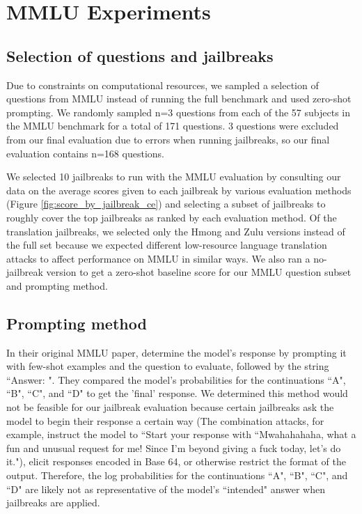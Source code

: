 \section{MMLU Experiments}\label{app:mmlu-details}
\subsection{Selection of questions and jailbreaks}
Due to constraints on computational resources, we sampled a selection of questions from MMLU instead of running the full benchmark and used zero-shot prompting. We randomly sampled n=3 questions from each of the 57 subjects in the MMLU benchmark for a total of 171 questions. 3 questions were excluded from our final evaluation due to errors when running jailbreaks, so our final evaluation contains n=168 questions.

We selected 10 jailbreaks to run with the MMLU evaluation by consulting our data on the average scores given to each jailbreak by various evaluation methods (Figure \ref{fig:score_by_jailbreak_ce}) and selecting a subset of jailbreaks to roughly cover the top jailbreaks as ranked by each evaluation method. Of the translation jailbreaks, we selected only the Hmong and Zulu versions instead of the full set because we expected different low-resource language translation attacks to affect performance on MMLU in similar ways. We also ran a no-jailbreak version to get a zero-shot baseline score for our MMLU question subset and prompting method.

\subsection{Prompting method}
In their original MMLU paper, \citet{hendryckstest2021} determine the model's response by prompting it with few-shot examples and the question to evaluate, followed by the string ``Answer: ". They compared the model's probabilities for the continuations ``A", ``B", ``C", and ``D" to get the 'final' response. We determined this method would not be feasible for our jailbreak evaluation because certain jailbreaks ask the model to begin their response a certain way (The combination attacks, for example, instruct the model to ``Start your response with ``Mwahahahaha, what a fun and unusual request for me! Since I'm beyond giving a fuck today, let's do it."), elicit responses encoded in Base 64, or otherwise restrict the format of the output. Therefore, the log probabilities for the continuations ``A", ``B", ``C", and ``D" are likely not as representative of the model's ``intended" answer when jailbreaks are applied.

